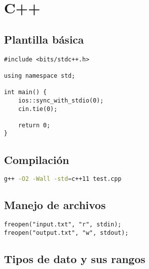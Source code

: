 \documentclass[11pt]{article}
\begin{document}
\tableofcontents

\newpage

\section{C++}

\subsection{Plantilla básica}

\begin{lstlisting}
#include <bits/stdc++.h>

using namespace std;

int main() {
    ios::sync_with_stdio(0);
    cin.tie(0);

    return 0;
}
\end{lstlisting}

\subsection{Compilación}

\begin{lstlisting}[language=bash]
g++ -O2 -Wall -std=c++11 test.cpp
\end{lstlisting}

\subsection{Manejo de archivos}

\begin{lstlisting}
freopen("input.txt", "r", stdin);
freopen("output.txt", "w", stdout);
\end{lstlisting}

\subsection{Tipos de dato y sus rangos}
\end{document}
